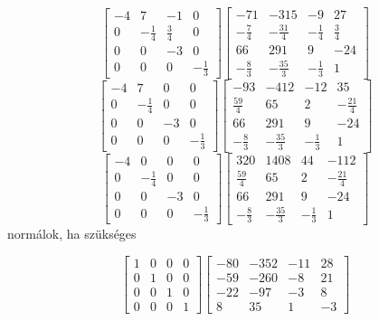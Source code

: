 \documentclass[12pt]{article}
\begin{document}
$$\left[{\begin{array}{cccc}-4& 7& -1& 0\\ 0& -\frac{1}{4}& \frac{3}{4}& 0\\ 0& 0& -3& 0\\ 0& 0& 0& -\frac{1}{3}\end{array}}\right]\left[{\begin{array}{cccc}-71& -315& -9& 27\\ -\frac{7}{4}& -\frac{31}{4}& -\frac{1}{4}& \frac{3}{4}\\ 66& 291& 9& -24\\ -\frac{8}{3}& -\frac{35}{3}& -\frac{1}{3}& 1\end{array}}\right]$$
$$\left[{\begin{array}{cccc}-4& 7& 0& 0\\ 0& -\frac{1}{4}& 0& 0\\ 0& 0& -3& 0\\ 0& 0& 0& -\frac{1}{3}\end{array}}\right]\left[{\begin{array}{cccc}-93& -412& -12& 35\\ \frac{59}{4}& 65& 2& -\frac{21}{4}\\ 66& 291& 9& -24\\ -\frac{8}{3}& -\frac{35}{3}& -\frac{1}{3}& 1\end{array}}\right]$$
$$\left[{\begin{array}{cccc}-4& 0& 0& 0\\ 0& -\frac{1}{4}& 0& 0\\ 0& 0& -3& 0\\ 0& 0& 0& -\frac{1}{3}\end{array}}\right]\left[{\begin{array}{cccc}320& 1408& 44& -112\\ \frac{59}{4}& 65& 2& -\frac{21}{4}\\ 66& 291& 9& -24\\ -\frac{8}{3}& -\frac{35}{3}& -\frac{1}{3}& 1\end{array}}\right]$$
normálok, ha szükséges

$$\left[{\begin{array}{cccc}1& 0& 0& 0\\ 0& 1& 0& 0\\ 0& 0& 1& 0\\ 0& 0& 0& 1\end{array}}\right]\left[{\begin{array}{cccc}-80& -352& -11& 28\\ -59& -260& -8& 21\\ -22& -97& -3& 8\\ 8& 35& 1& -3\end{array}}\right]$$
\end{document}
